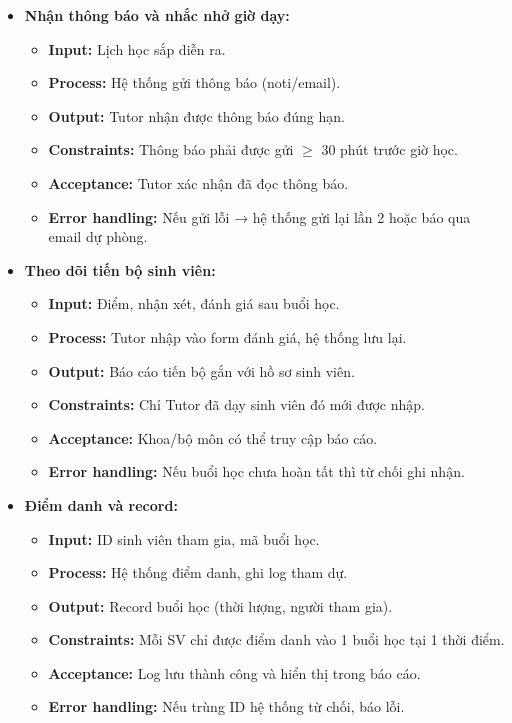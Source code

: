 \begin{itemize}
    \item \textbf{Nhận thông báo và nhắc nhở giờ dạy:}
    \begin{itemize}
        \item \textbf{Input:} Lịch học sắp diễn ra.
        \item \textbf{Process:} Hệ thống gửi thông báo (noti/email).
        \item \textbf{Output:} Tutor nhận được thông báo đúng hạn.
        \item \textbf{Constraints:} Thông báo phải được gửi $\geq$ 30 phút trước giờ học.
        \item \textbf{Acceptance:} Tutor xác nhận đã đọc thông báo.
        \item \textbf{Error handling:} Nếu gửi lỗi → hệ thống gửi lại lần 2 hoặc báo qua email dự phòng.
    \end{itemize}
    
    \item \textbf{Theo dõi tiến bộ sinh viên:}
    \begin{itemize}
        \item \textbf{Input:} Điểm, nhận xét, đánh giá sau buổi học.
        \item \textbf{Process:} Tutor nhập vào form đánh giá, hệ thống lưu lại.
        \item \textbf{Output:} Báo cáo tiến bộ gắn với hồ sơ sinh viên.
        \item \textbf{Constraints:} Chỉ Tutor đã dạy sinh viên đó mới được nhập.
        \item \textbf{Acceptance:} Khoa/bộ môn có thể truy cập báo cáo.
        \item \textbf{Error handling:} Nếu buổi học chưa hoàn tất thì từ chối ghi nhận.
    \end{itemize}
    
    \item \textbf{Điểm danh và record:}
    \begin{itemize}
        \item \textbf{Input:} ID sinh viên tham gia, mã buổi học.
        \item \textbf{Process:} Hệ thống điểm danh, ghi log tham dự.
        \item \textbf{Output:} Record buổi học (thời lượng, người tham gia).
        \item \textbf{Constraints:} Mỗi SV chỉ được điểm danh vào 1 buổi học tại 1 thời điểm.
        \item \textbf{Acceptance:} Log lưu thành công và hiển thị trong báo cáo.
        \item \textbf{Error handling:} Nếu trùng ID hệ thống từ chối, báo lỗi.
    \end{itemize}
    

\end{itemize}
